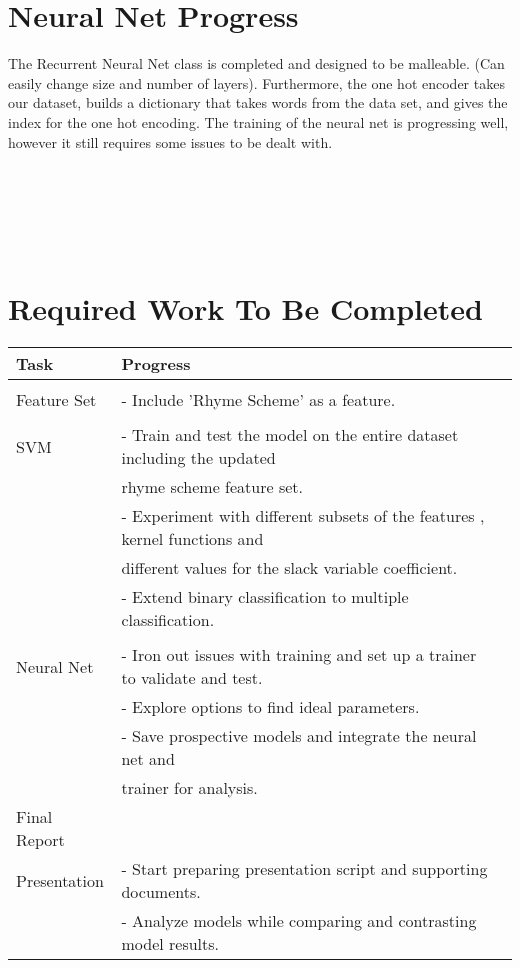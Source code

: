 \documentclass[journal]{IEEEtran}
\begin{document}
\section{Neural Net Progress}

The Recurrent Neural Net class is completed and designed to be malleable. (Can easily change size and number of layers). Furthermore, the one hot encoder takes our dataset, builds a dictionary that takes words from the data set, and gives the index for the one hot encoding. The training of the neural net is progressing well, however it still requires some issues to be dealt with.
\\ \\ \\ \\ \\ \\

\section{Required Work To Be Completed}

\begin{table}[h!]
  \begin{center}
    \label{tab:table1}
    \begin{tabular}{l|l|l|}
      \textbf{Task} & \textbf{Progress}\\

      \hline
\\
Feature Set
& - Include 'Rhyme Scheme' as a feature.\\
\\
SVM 
& - Train and test the model on the entire dataset including the updated \\
& rhyme scheme feature set. \\
& - Experiment with different subsets of the features , kernel functions and \\
& different values for the slack variable coefficient.\\
& - Extend binary classification to multiple classification. \\
\\
Neural Net
& - Iron out issues with training and set up a trainer to validate and test. \\
& - Explore options to find ideal parameters. \\
& - Save prospective models and integrate the neural net and \\
&  trainer for analysis. \\
Final Report \\
Presentation & - Start preparing presentation script and supporting documents. \\
& - Analyze models while comparing and contrasting model results.


    \end{tabular}
  \end{center}
\end{table}
\end{document}
